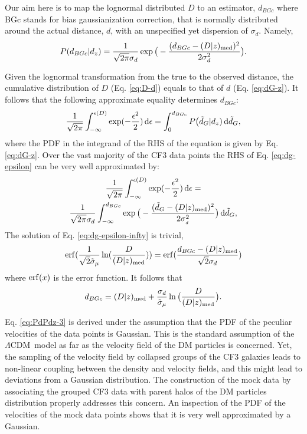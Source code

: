 \documentclass[useAMS,usenatbib]{mn2e}
\newcommand{\LCDM}{{$\Lambda$CDM}}
\renewcommand{\d}[1]{\ensuremath{\operatorname{d}\!{#1}}}
\begin{document}
Our aim here is to map the lognormal distributed $D$ to an estimator, $d_{BGc}$ where BGc stands for bias gaussianization correction,  that is normally distributed  around the actual distance, $d$,  with an unspecified yet  dispersion of $\sigma_d$. Namely, 
\begin{equation}
P(d_{BGc}\vert d_z)={1\over \sqrt{2\pi}\sigma_d} \exp\big( -{(d_{BGc}-(D\vert z)_{\rm med})^2\over 2 \sigma{_d^2}}   \big).
\label{eq:dG-z}
\end{equation}


Given the lognormal transformation from the true to the observed distance, the cumulative distribution of $D$ (Eq. \ref{eq:D-d})  equals to that of $d$ (Eq. \ref{eq:dG-z}). It follows that the following approximate equality determines $d_{BGc}$:\\
\begin{equation}
{1\over\sqrt{2\pi}}\int_{-\infty}^{\epsilon(D)}  \exp(-{\epsilon^2\over 2}) \d{\epsilon} =
\int_0^{d_{BGc}} P\big( \tilde{d}_G\vert d_z)\d{\tilde{d}_G},
\label{eq:dg-epsilon}
\end{equation}
where the PDF in the integrand of the RHS of the equation is given by Eq.   \ref{eq:dG-z}. 
Over the vast majority of the CF3 data points the RHS of Eq. \ref{eq:dg-epsilon} can be very well approximated by:
\begin{multline}
{1\over\sqrt{2\pi}}\int_{-\infty}^{\epsilon(D)}  \exp(-{\epsilon^2\over 2}) \d{\epsilon} =\\
{1\over \sqrt{2\pi}\sigma_d}  \int_{-\infty}^{d_{BGc}} 
                 \exp\big( -{(\tilde{d}_G-(D\vert z)_{\rm med})^2\over 2 \sigma_{_d}^2}   \big)\d{\tilde{d}_G},
\label{eq:dg-epsilon-infty}
\end{multline}
The solution of Eq. \ref{eq:dg-epsilon-infty} is  trivial,
\begin{equation}
{\rm erf}({1\over\sqrt{2}\tilde{\sigma}_\mu}\ln({D\over  (D\vert z)_{\rm med}}))={\rm erf}({d_{BGc}-(D\vert z)_{\rm med}\over\sqrt{2} \sigma_d})
\label{eq:erf-dg}
\end{equation}
where ${\rm erf}(x)$ is  the error function. It follows that
\begin{equation}
d_{BGc}=(D\vert z)_{\rm med} + {\sigma_d\over\tilde{\sigma}_\mu}\ln{\big({D\over(D\vert z)_{\rm med}}}\big).
\label{eq:dg}
\end{equation}

 Eq. \ref{eq:PdPdz-3}  is derived under the assumption that the PDF of the peculiar velocities of the data points is Gaussian. This is the standard assumption of the \LCDM\ model as far as the velocity field of the DM particles is concerned. Yet, the sampling of the velocity field by collapsed groups of the CF3 galaxies  leads to non-linear coupling between the density and velocity fields, and this might lead to deviations from a Gaussian distribution. The construction of the mock data by associating the grouped CF3 data with parent halos of the DM particles distribution properly addresses this concern. An inspection of the PDF of the velocities of the mock data points shows that it is very well approximated by a Gaussian.
\end{document}
